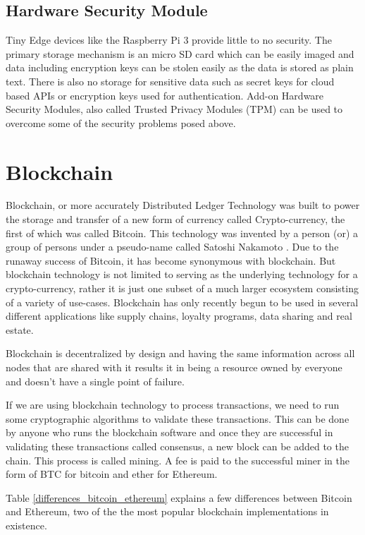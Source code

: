 \documentclass[11pt,openright]{report}
\begin{document}
\subsection{Hardware Security Module}
Tiny Edge devices like the Raspberry Pi 3 provide little to no security.
The primary storage mechanism is an micro SD card which can be easily imaged and data including encryption keys can be stolen easily as the data is stored as plain text. There is also no storage for sensitive data such as secret keys for cloud based APIs or encryption keys used for authentication. Add-on Hardware Security Modules, also called Trusted Privacy Modules (TPM) can be used to overcome some of the security problems posed above.

\section{Blockchain}
Blockchain, or more accurately Distributed Ledger Technology was built to power the storage and transfer of a new form of currency called Crypto-currency, the first of which was called Bitcoin. This technology was invented by a person (or) a group of persons under a pseudo-name called Satoshi Nakamoto \cite{nakamoto2012bitcoin}. Due to the runaway success of Bitcoin, it has become synonymous with blockchain. But blockchain technology is not limited to serving as the underlying technology for a crypto-currency, rather it is just one subset of a much larger ecosystem consisting of a variety of use-cases. Blockchain has only recently begun to be used in several different applications like supply chains, loyalty programs, data sharing and real estate.

Blockchain is decentralized by design and having the same information across all nodes that are shared with it results it in being a resource owned by everyone and doesn’t have a single point of failure. 

If we are using blockchain technology to process transactions, we need to run some cryptographic algorithms to validate these transactions. This can be done by anyone who runs the blockchain software and once they are successful in validating these transactions called consensus, a new block can be added to the chain. This process is called mining. A fee is paid to the successful miner in the form of BTC for bitcoin and ether for Ethereum.

Table \ref{differences_bitcoin_ethereum} explains a few differences between Bitcoin and Ethereum, two of the the most popular blockchain implementations in existence.
 
\end{document}
